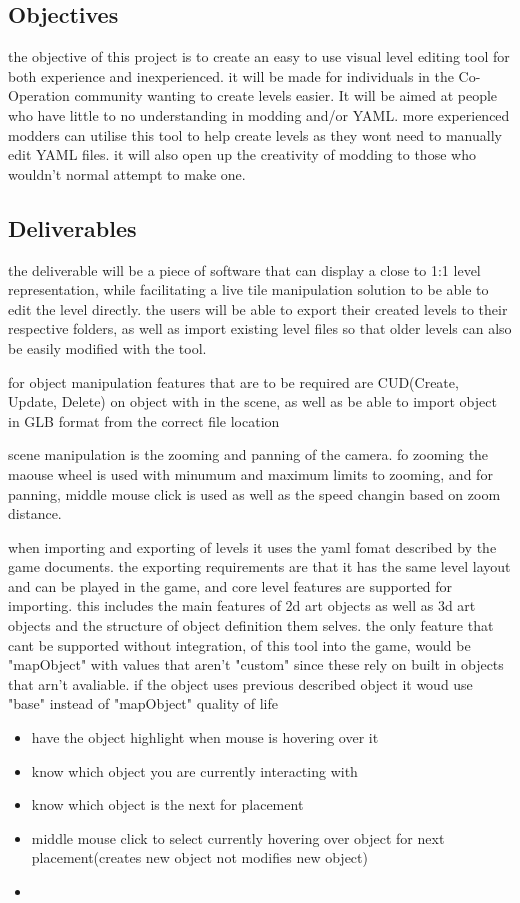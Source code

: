 \subsection{Objectives}
the objective of this project is to create an easy to use visual level editing tool for both experience and inexperienced. it will be made for individuals in the Co-Operation community wanting to create levels easier. It will be aimed at people who have little to no understanding in modding and/or YAML. more experienced modders can utilise this tool to help create levels as they wont need to manually edit YAML files. it will also open up the creativity of modding to those who wouldn't normal attempt to make one.
\subsection{Deliverables}
the deliverable will be a piece of software that can display a close to 1:1 level representation, while facilitating a live tile manipulation solution to be able to edit the level directly. the users will be able to export their created levels to their respective folders, as well as import existing level files so that older levels can also be easily modified with the tool.

for object manipulation features that are to be required are CUD(Create, Update, Delete) on object with in the scene, as well as be able to import object in GLB format from the correct file location

scene manipulation is the zooming and panning of the camera. fo zooming the maouse wheel is used with minumum and maximum limits to zooming, and for panning, middle mouse click is used as well as the speed changin based on zoom distance. 

when importing and exporting of levels it uses the yaml fomat described by the game documents. the exporting requirements are that it has the same level layout and can be played in the game, and core level features are supported for importing. this includes the main features of 2d art objects as well as 3d art objects and the structure of object definition them selves. the only feature that cant be supported without integration, of this tool into the game, would be "mapObject" with values that aren't "custom" since these rely on built in objects that arn't avaliable. if the object uses previous described object it woud use "base" instead of "mapObject" 
quality of life
\begin{itemize}
	\item have the object highlight when mouse is hovering over it
	\item know which object you are currently interacting with
	\item know which object is the next for placement
	\item middle mouse click to select currently hovering over object for next placement(creates new object not modifies new object)
	\item 
\end{itemize}


